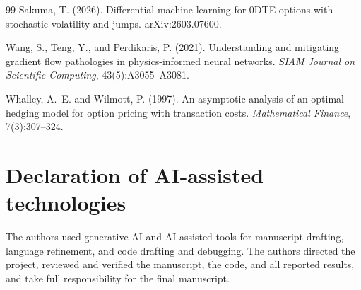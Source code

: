 \documentclass{article}
\begin{document}
\begin{thebibliography}{99}
Sakuma, T. (2026).
\newblock Differential machine learning for 0DTE options with stochastic
volatility and jumps.
\newblock arXiv:2603.07600.

Wang, S., Teng, Y., and Perdikaris, P. (2021).
\newblock Understanding and mitigating gradient flow pathologies in
physics-informed neural networks.
\newblock \emph{SIAM Journal on Scientific Computing}, 43(5):A3055--A3081.

Whalley, A.~E. and Wilmott, P. (1997).
\newblock An asymptotic analysis of an optimal hedging model for option pricing
with transaction costs.
\newblock \emph{Mathematical Finance}, 7(3):307--324.

\end{thebibliography}


\section*{Declaration of AI-assisted technologies}
The authors used generative AI and AI-assisted tools for manuscript drafting,
language refinement, and code drafting and debugging. The authors directed the
project, reviewed and verified the manuscript, the code, and all reported results,
and take full responsibility for the final manuscript.

\appendix
\end{document}
